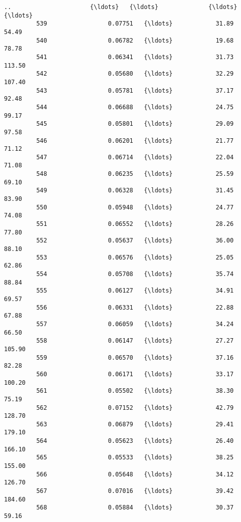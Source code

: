 \documentclass[11pt]{article}
\begin{document}
\begin{Verbatim}[commandchars=\\\{\}]
         ..                      {\ldots}   {\ldots}              {\ldots}              {\ldots}   
         539                 0.07751   {\ldots}            31.89            54.49   
         540                 0.06782   {\ldots}            19.68            78.78   
         541                 0.06341   {\ldots}            31.73           113.50   
         542                 0.05680   {\ldots}            32.29           107.40   
         543                 0.05781   {\ldots}            37.17            92.48   
         544                 0.06688   {\ldots}            24.75            99.17   
         545                 0.05801   {\ldots}            29.09            97.58   
         546                 0.06201   {\ldots}            21.77            71.12   
         547                 0.06714   {\ldots}            22.04            71.08   
         548                 0.06235   {\ldots}            25.59            69.10   
         549                 0.06328   {\ldots}            31.45            83.90   
         550                 0.05948   {\ldots}            24.77            74.08   
         551                 0.06552   {\ldots}            28.26            77.80   
         552                 0.05637   {\ldots}            36.00            88.10   
         553                 0.06576   {\ldots}            25.05            62.86   
         554                 0.05708   {\ldots}            35.74            88.84   
         555                 0.06127   {\ldots}            34.91            69.57   
         556                 0.06331   {\ldots}            22.88            67.88   
         557                 0.06059   {\ldots}            34.24            66.50   
         558                 0.06147   {\ldots}            27.27           105.90   
         559                 0.06570   {\ldots}            37.16            82.28   
         560                 0.06171   {\ldots}            33.17           100.20   
         561                 0.05502   {\ldots}            38.30            75.19   
         562                 0.07152   {\ldots}            42.79           128.70   
         563                 0.06879   {\ldots}            29.41           179.10   
         564                 0.05623   {\ldots}            26.40           166.10   
         565                 0.05533   {\ldots}            38.25           155.00   
         566                 0.05648   {\ldots}            34.12           126.70   
         567                 0.07016   {\ldots}            39.42           184.60   
         568                 0.05884   {\ldots}            30.37            59.16   
         

\end{Verbatim}
\end{document}
